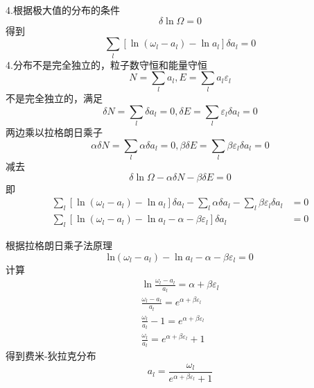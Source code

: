 4.根据极大值的分布的条件
\begin{equation}
    \delta \ln \Omega =0
\end{equation}
得到
\begin{equation}
    \sum_l{\left[ \ln \left( \omega _l-a_l \right) -\ln a_l \right] \delta a_l}=0
\end{equation}
4.分布不是完全独立的，粒子数守恒和能量守恒
\begin{equation}
    N=\sum_l{a_l},E=\sum_l{a_l\varepsilon _l}
\end{equation}
不是完全独立的，满足
\begin{equation}
    \delta N=\sum_l{\delta a_l}=0,\delta E=\sum_l{\varepsilon _l\delta a_l}=0
\end{equation}
两边乘以拉格朗日乘子
\begin{equation}
    \alpha \delta N=\sum_l{\alpha \delta a_l}=0,\beta \delta E=\sum_l{\beta \varepsilon _l\delta a_l}=0
\end{equation}
减去
\begin{equation}
    \delta \ln \Omega -\alpha \delta N-\beta \delta E=0
\end{equation}
即
\begin{equation}
    \begin{aligned}
        \sum_l{\left[ \ln \left( \omega _l-a_l \right) -\ln a_l \right] \delta a_l}-\sum_l{\alpha \delta a_l}-\sum_l{\beta \varepsilon _l\delta a_l}&=0
\\
\sum_l{\left[ \ln \left( \omega _l-a_l \right) -\ln a_l-\alpha -\beta \varepsilon _l \right] \delta a_l}&=0
    \end{aligned}
\end{equation}

根据拉格朗日乘子法原理
\begin{equation}
    \mathrm{ln}\left( \omega _l-a_l \right) -\ln a_l-\alpha -\beta \varepsilon _l=0
\end{equation}
计算
\begin{equation}
    \begin{aligned}
        \ln \frac{\omega _l-a_l}{a_l}=\alpha +\beta \varepsilon _l
\\
\frac{\omega _l-a_l}{a_l}=e^{\alpha +\beta \varepsilon _l}
\\
\frac{\omega _l}{a_l}-1=e^{\alpha +\beta \varepsilon _l}
\\
\frac{\omega _l}{a_l}=e^{\alpha +\beta \varepsilon _l}+1
    \end{aligned}
\end{equation}
得到费米-狄拉克分布
\begin{equation}
    a_l=\frac{\omega _l}{e^{\alpha +\beta \varepsilon _l}+1}
\end{equation}
